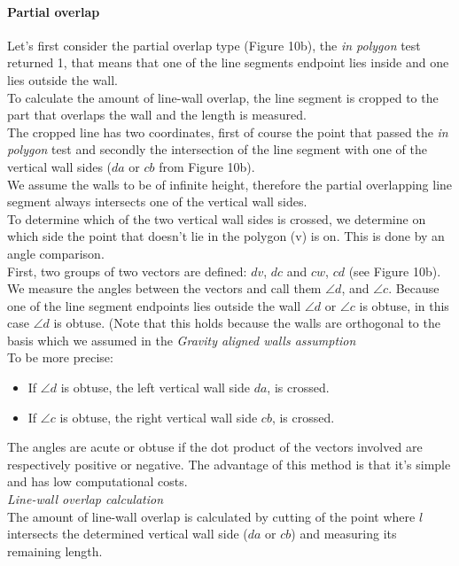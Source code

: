 	\paragraph{Partial overlap}
	Let's first consider the partial overlap type (Figure 10b), the \emph{in polygon} test
	returned 1, that means that one of the line segments endpoint lies inside
	and one lies outside the wall.\\
	To calculate the amount of line-wall overlap, the line segment is cropped to the
	part that overlaps the wall and the length is measured.\\
	The cropped line has two coordinates, first of course the point that passed
	the \emph{in polygon} test and secondly the intersection of the line
	segment with one of the vertical wall sides ($da$ or $cb$ from Figure 10b).\\
	We assume the walls to be of infinite height, therefore the 
	partial overlapping line segment always intersects one of the
	vertical wall sides.\\
	To determine which of the two vertical wall sides is crossed, we determine
	on which side the point that doesn't lie in the polygon (v) is on.  This is
	done by an angle comparison.\\
	First, two groups of two vectors are defined: $dv$, $dc$ and $cw$, $cd$ (see Figure 10b).
	We measure the angles between the vectors and call them $\angle d$, and
	$\angle c$. 
	Because one of the line segment endpoints lies outside
	the wall $\angle d$ or $\angle c$ is obtuse, in this case $\angle d$ is obtuse.
	(Note that this holds because the walls are orthogonal to the basis
	which we assumed in the \emph{Gravity aligned walls assumption}\\
	To be more precise: 
	\begin{itemize}
	\item If $\angle d$ is obtuse, the left vertical wall side $da$, is
	crossed. \\
	\item If $\angle c$ is obtuse, the right vertical wall side $cb$, is
	crossed. \\
	\end{itemize}
	The angles are acute or obtuse if the dot product of the vectors involved
	are respectively positive or negative. The advantage of this method is that
	it's simple and has low computational costs.\\
	
	\emph{Line-wall overlap calculation}\\
	The amount of line-wall overlap is calculated by cutting of the
	point where $l$ intersects the determined vertical wall side ($da$ or
	$cb$) and measuring its remaining length.\\

